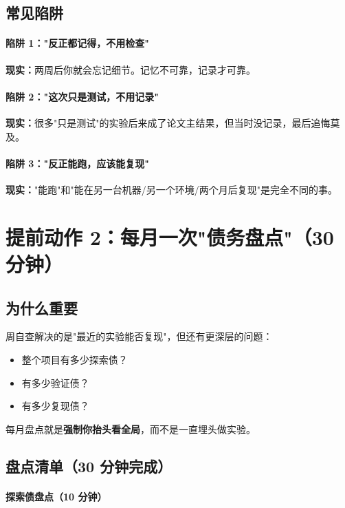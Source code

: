 \subsection{常见陷阱}

\paragraph{陷阱 1："反正都记得，不用检查"}

\textbf{现实：}两周后你就会忘记细节。记忆不可靠，记录才可靠。

\paragraph{陷阱 2："这次只是测试，不用记录"}

\textbf{现实：}很多"只是测试"的实验后来成了论文主结果，但当时没记录，最后追悔莫及。

\paragraph{陷阱 3："反正能跑，应该能复现"}

\textbf{现实：}"能跑"和"能在另一台机器/另一个环境/两个月后复现"是完全不同的事。

\section{提前动作 2：每月一次"债务盘点"（30 分钟）}

\subsection{为什么重要}

周自查解决的是"最近的实验能否复现"，但还有更深层的问题：
\begin{itemize}
  \item 整个项目有多少探索债？
  \item 有多少验证债？
  \item 有多少复现债？
\end{itemize}

每月盘点就是\textbf{强制你抬头看全局}，而不是一直埋头做实验。

\subsection{盘点清单（30 分钟完成）}

\paragraph{探索债盘点（10 分钟）}

